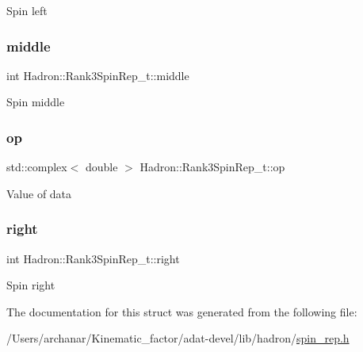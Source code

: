 Spin left \mbox{\label{structHadron_1_1Rank3SpinRep__t_a5901db603fb0f90ff5d21e2a2200f113}} 
\subsubsection{\texorpdfstring{middle}{middle}}
{\footnotesize\ttfamily int Hadron\+::\+Rank3\+Spin\+Rep\+\_\+t\+::middle}

Spin middle \mbox{\label{structHadron_1_1Rank3SpinRep__t_aef54e280db29fb78a40da50a1009c4d7}} 
\subsubsection{\texorpdfstring{op}{op}}
{\footnotesize\ttfamily std\+::complex$<$ double $>$ Hadron\+::\+Rank3\+Spin\+Rep\+\_\+t\+::op}

Value of data \mbox{\label{structHadron_1_1Rank3SpinRep__t_a4c75ba1e0c96a5d679368619cbcbbcf0}} 
\subsubsection{\texorpdfstring{right}{right}}
{\footnotesize\ttfamily int Hadron\+::\+Rank3\+Spin\+Rep\+\_\+t\+::right}

Spin right 

The documentation for this struct was generated from the following file\+:\begin{DoxyCompactItemize}
\item 
/\+Users/archanar/\+Kinematic\+\_\+factor/adat-\/devel/lib/hadron/\mbox{\hyperlink{adat-devel_2lib_2hadron_2spin__rep_8h}{spin\+\_\+rep.\+h}}\end{DoxyCompactItemize}
